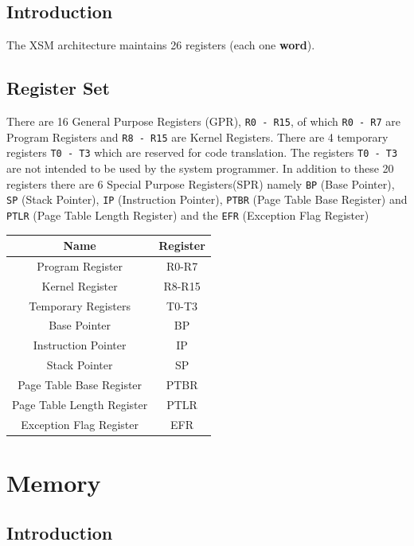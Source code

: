 \documentclass[11pt]{report}
\begin{document}
\section{Introduction}

The XSM architecture maintains 26 registers (each one \textbf{word}).

\section{Register Set}
There are 16 General Purpose Registers (GPR), \texttt{R0 - R15}, of which \texttt{R0 - R7} are Program Registers and \texttt{R8 - R15} are Kernel Registers. There are 4 temporary registers \texttt{T0 - T3} which are reserved for code translation. The registers \texttt{T0 - T3} are not intended to be used by the system programmer. In addition to these 20 registers there are 6 Special Purpose Registers(SPR) namely \texttt{BP} (Base Pointer), \texttt{SP} (Stack Pointer),  \texttt{IP} (Instruction Pointer), \texttt{PTBR} (Page Table Base Register) and \texttt{PTLR} (Page Table Length Register) and the \texttt{EFR} (Exception Flag Register)



\begin{center}
\begin{tabular}{|c|c|}
\hline Name & Register \\ 
\hline Program Register & R0-R7 \\ 
\hline Kernel Register & R8-R15 \\ 
\hline Temporary Registers & T0-T3 \\ 
\hline Base Pointer & BP \\ 
\hline Instruction Pointer & IP \\ 
\hline Stack Pointer & SP \\ 
\hline Page Table Base Register & PTBR \\
\hline Page Table Length Register & PTLR \\
\hline Exception Flag Register & EFR \\
\hline
\end{tabular} 
\end{center}


\chapter{Memory}
\label{sec:mem}

\section{Introduction}
\end{document}
